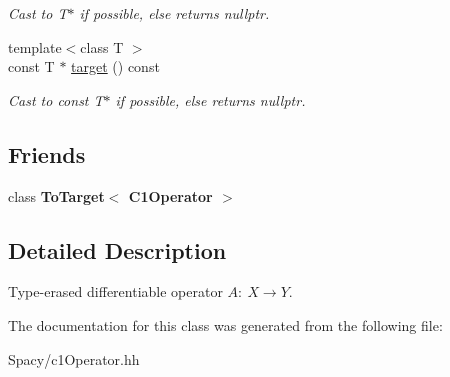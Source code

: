 \begin{DoxyCompactItemize}
\begin{DoxyCompactList}\small\item\em Cast to T$\ast$ if possible, else returns nullptr. \end{DoxyCompactList}\item 
\hypertarget{structSpacy_1_1Mixin_1_1ToTarget_a98985b22f6fc98d253c8416c54a5e359}{}{\footnotesize template$<$class T $>$ }\\const T $\ast$ \hyperlink{structSpacy_1_1Mixin_1_1ToTarget_a98985b22f6fc98d253c8416c54a5e359}{target} () const \label{structSpacy_1_1Mixin_1_1ToTarget_a98985b22f6fc98d253c8416c54a5e359}

\begin{DoxyCompactList}\small\item\em Cast to const T$\ast$ if possible, else returns nullptr. \end{DoxyCompactList}\end{DoxyCompactItemize}
\subsection*{Friends}
\begin{DoxyCompactItemize}
\item 
\hypertarget{classSpacy_1_1C1Operator_a2fd2b4eb0de62688c778fb8984621e63}{}class {\bfseries To\+Target$<$ C1\+Operator $>$}\label{classSpacy_1_1C1Operator_a2fd2b4eb0de62688c778fb8984621e63}

\end{DoxyCompactItemize}


\subsection{Detailed Description}
Type-\/erased differentiable operator $A:\ X \to Y $. 

The documentation for this class was generated from the following file\+:\begin{DoxyCompactItemize}
\item 
Spacy/c1\+Operator.\+hh\end{DoxyCompactItemize}
